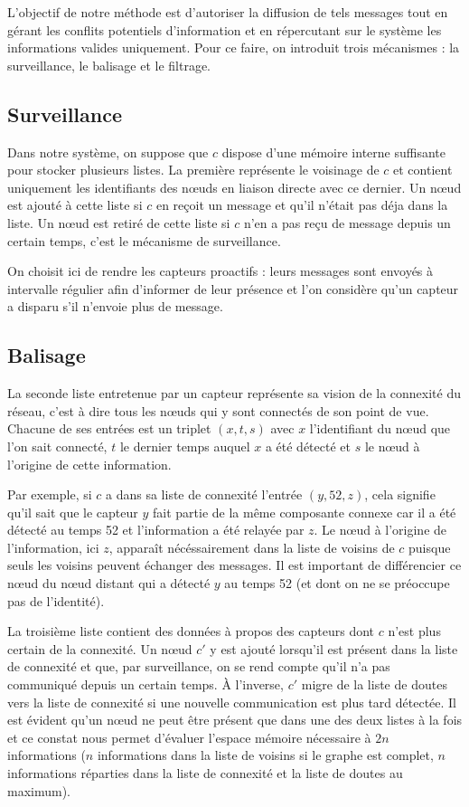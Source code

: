 \documentclass[10pt]{article}
\begin{document}
\begin{multicols}{2}
L'objectif de notre méthode est d'autoriser la diffusion de tels
messages tout en gérant les conflits potentiels d'information et en
répercutant sur le système les informations valides uniquement. Pour
ce faire, on introduit trois mécanismes : la surveillance, le balisage
et le filtrage.

\subsection*{Surveillance}

Dans notre système, on suppose que $c$ dispose d'une mémoire interne
suffisante pour stocker plusieurs listes. La première représente le
voisinage de $c$ et contient uniquement les identifiants des n\oe uds
en liaison directe avec ce dernier. Un n\oe ud est ajouté à cette
liste si $c$ en reçoit un message et qu'il n'était pas déja dans la
liste. Un n\oe ud est retiré de cette liste si $c$ n'en a pas reçu de
message depuis un certain temps, c'est le mécanisme de surveillance.

On choisit ici de rendre les capteurs proactifs : leurs messages sont
envoyés à intervalle régulier afin d'informer de leur présence et l'on
considère qu'un capteur a disparu s'il n'envoie plus de message.

\subsection*{Balisage}

La seconde liste entretenue par un capteur représente sa vision de la
connexité du réseau, c'est à dire tous les n\oe uds qui y sont
connectés de son point de vue. Chacune de ses entrées est un triplet
$(x,t,s)$ avec $x$ l'identifiant du n\oe ud que l'on sait connecté,
$t$ le dernier temps auquel $x$ a été détecté et $s$ le n\oe ud à
l'origine de cette information.

Par exemple, si $c$ a dans sa liste de connexité l'entrée $(y,52,z)$,
cela signifie qu'il sait que le capteur $y$ fait partie de la même
composante connexe car il a été détecté au temps 52 et l'information a
été relayée par $z$. Le n\oe ud à l'origine de l'information, ici $z$,
apparaît nécéssairement dans la liste de voisins de $c$ puisque seuls
les voisins peuvent échanger des messages. Il est important de
différencier ce n\oe ud du n\oe ud distant qui a détecté $y$ au temps
52 (et dont on ne se préoccupe pas de l'identité).

La troisième liste contient des données à propos des capteurs dont $c$
n'est plus certain de la connexité. Un n\oe ud $c'$ y est ajouté
lorsqu'il est présent dans la liste de connexité et que, par
surveillance, on se rend compte qu'il n'a pas communiqué depuis un
certain temps. \`A l'inverse, $c'$ migre de la liste de doutes vers la
liste de connexité si une nouvelle communication est plus tard
détectée. Il est évident qu'un n\oe ud ne peut être présent que dans
une des deux listes à la fois et ce constat nous permet d'évaluer
l'espace mémoire nécessaire à $2n$ informations ($n$ informations dans
la liste de voisins si le graphe est complet, $n$ informations
réparties dans la liste de connexité et la liste de doutes au
maximum).


\end{multicols}
\end{document}
